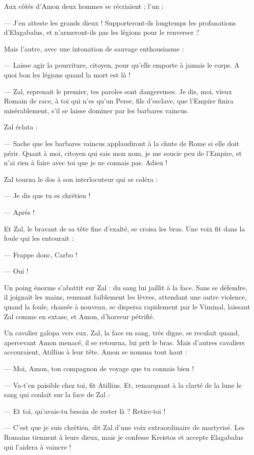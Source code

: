\documentclass[a4paper, 11pt, oneside, polutonikogreek, french]{article}
\begin{document}
Aux côtés d'Amon deux hommes se récriaient ; l'un :

--- J'en atteste les grands dieux ! Supporteront-ils longtemps les profanations d'Elagabalus, et n'armeront-ils pas les légions pour le renverser ?

Mais l'autre, avec une intonation de sauvage enthousiasme :

--- Laisse agir la pourriture, citoyen, pour qu'elle emporte à jamais le corps. A quoi bon les légions quand la mort est là !

--- Zal, reprenait le premier, tes paroles sont dangereuses. Je dis, moi, vieux Romain de race, à toi qui n'es qu'un Perse, fils d'esclave, que l'Empire finira misérablement, s'il se laisse dominer par les barbares vaincus.

Zal éclata :

--- Sache que les barbares vaincus applaudiront à la chute de Rome si elle doit périr. Quant à moi, citoyen qui sais mon nom, je me soucie peu de l'Empire, et n'ai rien à faire avec toi que je ne connais pas. Adieu !

Zal tourna le dos à son interlocuteur qui se coléra :

--- Je dis que tu es chrétien !

--- Après !

Et Zal, le bravant de sa tête fine d'exalté, se croisa les bras. Une voix fit dans la foule qui les entourait :

--- Frappe donc, Carbo !

--- Oui !

Un poing énorme s'abattit sur Zal : du sang lui jaillit à la face. Sans se défendre, il joignait les mains, remuant faiblement les lèvres, attendant une autre violence, quand la foule, chassée à nouveau, se dispersa rapidement par le Viminal, laissant Zal comme en extase, et Amon, d'horreur pétrifié.

Un cavalier galopa vers eux. Zal, la face en sang, très digne, se reculait quand, apercevant Amon menacé, il se retourna, lui prit le bras. Mais d'autres cavaliers accouraient, Atillius à leur tête. Amon se nomma tout haut :

--- Moi, Amon, ton compagnon de voyage que tu connais bien !

--- Va-t'en paisible chez toi, fit Atillius. Et, remarquant à la clarté de la lune le sang qui coulait sur la face de Zal :

--- Et toi, qu'avais-tu besoin de rester là ? Retire-toi !

--- C'est que je suis chrétien, dit Zal d'une voix extraordinaire de martyrisé. Les Romains tiennent à leurs dieux, mais je confesse Kreistos et accepte Elagabalus qui l'aidera à vaincre !
\end{document}
